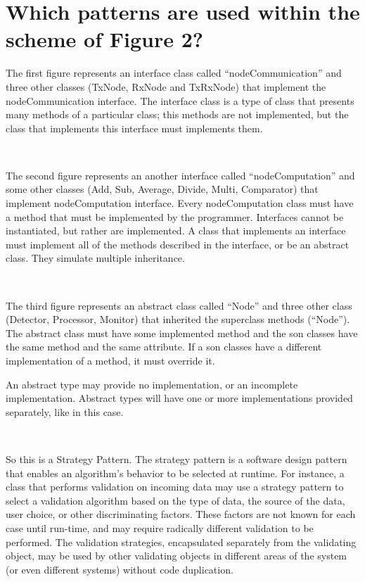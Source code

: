 \documentclass[a4paper,titlepage]{article}
\begin{document}
\section*{ Which patterns are used within the scheme of Figure 2?}

The first figure represents an interface class called ``nodeCommunication'' and three other classes (TxNode, RxNode and TxRxNode) that implement the nodeCommunication interface. The interface class is a type of class that presents many methods of a particular class; this methods are not implemented, but the class that implements this interface must implements them.

~

The second figure represents an another interface called ``nodeComputation'' and some other classes (Add, Sub, Average, Divide, Multi, Comparator) that implement nodeComputation interface. Every nodeComputation class must have a method that must be implemented by the programmer. Interfaces cannot be instantiated, but rather are implemented. A class that implements an interface must implement all of the methods described in the interface, or be an abstract class. They simulate multiple inheritance.

~

The third figure represents an abstract class called ``Node'' and three other class (Detector, Processor, Monitor) that inherited the superclass methods (``Node''). The abstract class must have some implemented method and the son classes have the same method and the same attribute. If a son classes have a different implementation of a method, it must override it.  

An abstract type may provide no implementation, or an incomplete implementation. Abstract types will have one or more implementations provided separately, like in this case. 

~

So this is a Strategy Pattern. The strategy pattern is a software design pattern that enables an algorithm's behavior to be selected at runtime. For instance, a class that performs validation on incoming data may use a strategy pattern to select a validation algorithm based on the type of data, the source of the data, user choice, or other discriminating factors. These factors are not known for each case until run-time, and may require radically different validation to be performed. The validation strategies, encapsulated separately from the validating object, may be used by other validating objects in different areas of the system (or even different systems) without code duplication.
\end{document}
